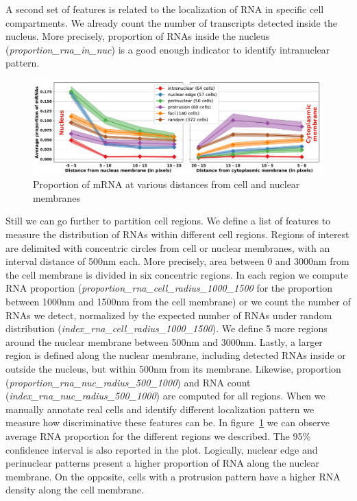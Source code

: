 A second set of features is related to the localization of \ac{RNA} in specific cell compartments.
We already count the number of transcripts detected inside the nucleus.
More precisely, proportion of \ac{RNA}s inside the nucleus (\emph{proportion\_rna\_in\_nuc}) is a good enough indicator to identify intranuclear pattern.

\begin{figure}[h]
    \centering
    \includegraphics[width=1\textwidth]{figures/chapter4/plot_topography}
    \caption{Proportion of \ac{mRNA} at various distances from cell and nuclear membranes}
    \label{fig:features_topography}
\end{figure}

Still we can go further to partition cell regions.
We define a list of features to measure the distribution of \ac{RNA}s within different cell regions.
Regions of interest are delimited with concentric circles from cell or nuclear membranes, with an interval distance of 500nm each.
More precisely, area between 0 and 3000nm from the cell membrane is divided in six concentric regions.
In each region we compute \ac{RNA} proportion (\emph{proportion\_rna\_cell\_radius\_1000\_1500} for the proportion between 1000nm and 1500nm from the cell membrane) or we count the number of \ac{RNA}s we detect, normalized by the expected number of \ac{RNA}s under random distribution (\emph{index\_rna\_cell\_radius\_1000\_1500}).
We define 5 more regions around the nuclear membrane between 500nm and 3000nm.
Lastly, a larger region is defined along the nuclear membrane, including detected \ac{RNA}s inside or outside the nucleus, but within 500nm from its membrane.
Likewise, proportion (\emph{proportion\_rna\_nuc\_radius\_500\_1000}) and \ac{RNA} count (\emph{index\_rna\_nuc\_radius\_500\_1000}) are computed for all regions.
When we manually annotate real cells and identify different localization pattern we measure how discriminative these features can be.
In figure~\ref{fig:features_topography} we can observe average \ac{RNA} proportion for the different regions we described.
The 95\% confidence interval is also reported in the plot.
Logically, nuclear edge and perinuclear patterns present a higher proportion of \ac{RNA} along the nuclear membrane.
On the opposite, cells with a protrusion pattern have a higher \ac{RNA} density along the cell membrane.

